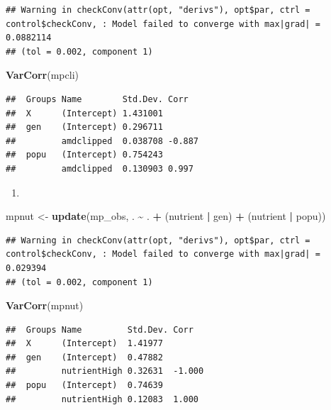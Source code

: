 \documentclass[
  12pt,
]{book}
\newenvironment{Shaded}{\begin{snugshade}}{\end{snugshade}}
\newcommand{\KeywordTok}[1]{\textcolor[rgb]{0.13,0.29,0.53}{\textbf{#1}}}
\newcommand{\NormalTok}[1]{#1}
\newcommand{\OperatorTok}[1]{\textcolor[rgb]{0.81,0.36,0.00}{\textbf{#1}}}
\newcommand{\StringTok}[1]{\textcolor[rgb]{0.31,0.60,0.02}{#1}}
\providecommand{\tightlist}{%
  \setlength{\itemsep}{0pt}\setlength{\parskip}{0pt}}
\begin{document}
\begin{verbatim}
## Warning in checkConv(attr(opt, "derivs"), opt$par, ctrl = control$checkConv, : Model failed to converge with max|grad| = 0.0882114
## (tol = 0.002, component 1)
\end{verbatim}

\begin{Shaded}
\begin{Highlighting}[]
\KeywordTok{VarCorr}\NormalTok{(mpcli)}
\end{Highlighting}
\end{Shaded}

\begin{verbatim}
##  Groups Name        Std.Dev. Corr  
##  X      (Intercept) 1.431001       
##  gen    (Intercept) 0.296711       
##         amdclipped  0.038708 -0.887
##  popu   (Intercept) 0.754243       
##         amdclipped  0.130903 0.997
\end{verbatim}

\begin{enumerate}
\def\labelenumi{\arabic{enumi}.}
\setcounter{enumi}{1}
\tightlist
\item
\end{enumerate}

\begin{Shaded}
\begin{Highlighting}[]
\NormalTok{mpnut \textless{}{-}}\StringTok{ }\KeywordTok{update}\NormalTok{(mp\_obs, . }\OperatorTok{\textasciitilde{}}\StringTok{ }\NormalTok{. }\OperatorTok{+}\StringTok{ }\NormalTok{(nutrient }\OperatorTok{|}\StringTok{ }\NormalTok{gen) }\OperatorTok{+}\StringTok{ }\NormalTok{(nutrient }\OperatorTok{|}\StringTok{ }\NormalTok{popu))}
\end{Highlighting}
\end{Shaded}

\begin{verbatim}
## Warning in checkConv(attr(opt, "derivs"), opt$par, ctrl = control$checkConv, : Model failed to converge with max|grad| = 0.029394
## (tol = 0.002, component 1)
\end{verbatim}

\begin{Shaded}
\begin{Highlighting}[]
\KeywordTok{VarCorr}\NormalTok{(mpnut)}
\end{Highlighting}
\end{Shaded}

\begin{verbatim}
##  Groups Name         Std.Dev. Corr  
##  X      (Intercept)  1.41977        
##  gen    (Intercept)  0.47882        
##         nutrientHigh 0.32631  -1.000
##  popu   (Intercept)  0.74639        
##         nutrientHigh 0.12083  1.000
\end{verbatim}
\end{document}
